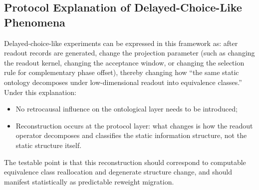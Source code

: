 \subsection{Protocol Explanation of Delayed-Choice-Like Phenomena}

Delayed-choice-like experiments can be expressed in this framework as: after readout records are generated, change the projection parameter (such as changing the readout kernel, changing the acceptance window, or changing the selection rule for complementary phase offset), thereby changing how ``the same static ontology decomposes under low-dimensional readout into equivalence classes.'' Under this explanation:
\begin{itemize}
  \item No retrocausal influence on the ontological layer needs to be introduced;
  \item Reconstruction occurs at the protocol layer: what changes is how the readout operator decomposes and classifies the static information structure, not the static structure itself.
\end{itemize}
The testable point is that this reconstruction should correspond to computable equivalence class reallocation and degenerate structure change, and should manifest statistically as predictable reweight migration.
